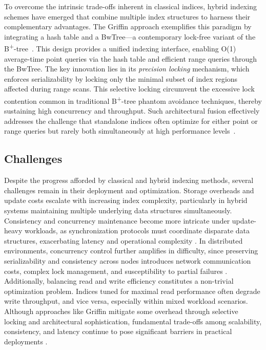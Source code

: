 \documentclass[sigconf]{acmart}
\begin{document}
To overcome the intrinsic trade-offs inherent in classical indices, hybrid indexing schemes have emerged that combine multiple index structures to harness their complementary advantages. The Griffin approach exemplifies this paradigm by integrating a hash table and a BwTree---a contemporary lock-free variant of the B\textsuperscript{+}-tree~\cite{ref35}. This design provides a unified indexing interface, enabling O(1) average-time point queries via the hash table and efficient range queries through the BwTree. The key innovation lies in its \emph{precision locking} mechanism, which enforces serializability by locking only the minimal subset of index regions affected during range scans. This selective locking circumvent the excessive lock contention common in traditional B\textsuperscript{+}-tree phantom avoidance techniques, thereby sustaining high concurrency and throughput. Such architectural fusion effectively addresses the challenge that standalone indices often optimize for either point or range queries but rarely both simultaneously at high performance levels~\cite{ref35}.

\subsection{Challenges}

Despite the progress afforded by classical and hybrid indexing methods, several challenges remain in their deployment and optimization. Storage overheads and update costs escalate with increasing index complexity, particularly in hybrid systems maintaining multiple underlying data structures simultaneously. Consistency and concurrency maintenance become more intricate under update-heavy workloads, as synchronization protocols must coordinate disparate data structures, exacerbating latency and operational complexity \cite{ref31,ref35}. In distributed environments, concurrency control further amplifies in difficulty, since preserving serializability and consistency across nodes introduces network communication costs, complex lock management, and susceptibility to partial failures \cite{ref31}. Additionally, balancing read and write efficiency constitutes a non-trivial optimization problem. Indices tuned for maximal read performance often degrade write throughput, and vice versa, especially within mixed workload scenarios. Although approaches like Griffin mitigate some overhead through selective locking and architectural sophistication, fundamental trade-offs among scalability, consistency, and latency continue to pose significant barriers in practical deployments \cite{ref31,ref35}.
\end{document}
